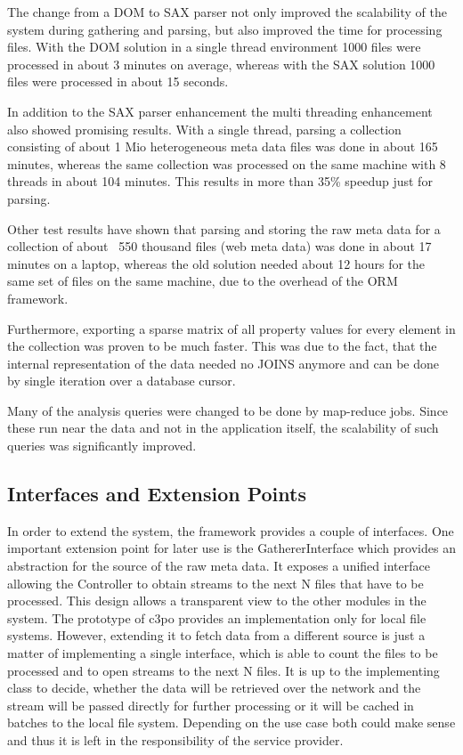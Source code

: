 The change from a DOM to SAX parser not only improved the scalability of the system during gathering and parsing, but also improved the time for processing files. With the DOM solution in a single thread environment 1000 files were processed in about 3 minutes on average, whereas with the SAX solution 1000 files were processed in about 15 seconds.

In addition to the SAX parser enhancement the multi threading enhancement also showed promising results. With a single thread, parsing a collection consisting of about 1 Mio heterogeneous meta data files was done in about 165 minutes, whereas the same collection was processed on the same machine with 8 threads in about 104 minutes. This results in more than 35\% speedup just for parsing.

Other test results have shown that parsing and storing the raw meta data for a collection of about ~550 thousand files (web meta data) was done in about 17 minutes on a laptop, whereas the old solution needed about 12 hours for the same set of files on the same machine, due to the overhead of the ORM framework.

Furthermore, exporting a sparse matrix of all property values for every element in the collection was proven to be much faster. This was due to the fact, that the internal representation of the data needed no JOINS anymore and can be done by single iteration over a database cursor.

Many of the analysis queries were changed to be done by map-reduce jobs. Since these run near the data and not in the application itself, the scalability of such queries was significantly improved.

\subsection{Interfaces and Extension Points}
In order to extend the system, the framework provides a couple of interfaces. One important extension point for later use is the GathererInterface which provides an abstraction for the source of the raw meta data. It exposes a unified interface allowing the Controller to obtain streams to the next N files that have to be processed. This design allows a transparent view to the other modules in the system. The prototype of c3po provides an implementation only for local file systems. However, extending it to fetch data from a different source is just a matter of implementing a single interface, which is able to count the files to be processed and to open streams to the next N files. It is up to the implementing class to decide, whether the data will be retrieved over the network and the stream will be passed directly for further processing or it will be cached in batches to the local file system. Depending on the use case both could make sense and thus it is left in the responsibility of the service provider.

